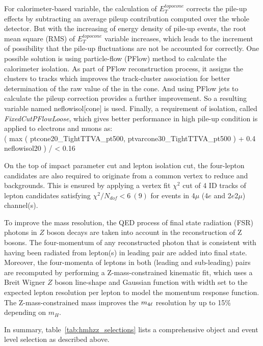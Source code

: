 For calorimeter-based variable, the calculation of $E_{T}^{topocone}$ corrects the pile-up effects by subtracting an average pileup contribution computed over the whole detector.
But with the increasing of energy density of pile-up events, the root mean square (RMS) of $E_{T}^{topocone}$ variable increases,
which leads to the increment of possibility that the pile-up fluctuations are not be accounted for correctly.
One possible solution is using particle-flow (PFlow) method to calculate the calorimeter isolation.
As part of PFlow reconstruction process, it assigns the clusters to tracks which improves the track-cluster association for better determination of the raw value of the \et in the cone.
And using PFlow jets to calculate the pileup correction provides a further improvement.
So a resulting variable named neflowisol[cone] is used.
Finally, a requirement of isolation, called \textit{FixedCutPFlowLoose}, which gives better performance in high pile-up condition is applied to electrons and muons as: \\
	( max ( ptcone20\_TightTTVA\_pt500, ptvarcone30\_TightTTVA\_pt500 ) + 0.4 \times neflowisol20 ) / \pt < 0.16

On the top of impact parameter cut and lepton isolation cut, the four-lepton candidates are also required to originate from a common vertex to reduce \Zjet and \ttbar backgrounds.
This is ensured by applying a vertex fit $\chi^2$ cut of 4 ID tracks of lepton candidates satisfying $\chi^2 / N_{dof} < 6~(9)$ for events in 4$\mu$ (4$e$ and 2$e$2$\mu$) channel(s).

To improve the mass resolution, the QED process of final state radiation (FSR) photons in $Z$ boson decays are taken into account in the reconstruction of Z bosons.
The four-momentum of any reconstructed photon that is consistent with having been radiated from lepton(s) in leading pair are added into final state.
Moreover, the four-momenta of leptons in both (leading and sub-leading) pairs are recomputed by performing a Z-mass-constrained kinematic fit,
which uses a Breit Wigner $Z$ boson line-shape and Gaussian function with width set to the expected lepton resolution per lepton to model the momentum response function.
The Z-mass-constrained mass improves the $m_{4\ell}$ resolution by up to 15\% depending on $m_{H}$.

In summary, table~\ref{tab:hmhzz_selections} lists a comprehensive object and event level selection as described above.

